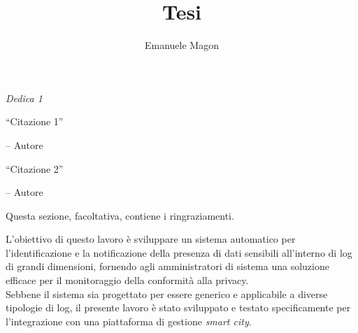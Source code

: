 \documentclass[12pt]{report}
\title{Tesi}
\author{Emanuele Magon}
\begin{document}
\makecenteredfrontpage
{}

%
%

{\raggedleft \large \sl Dedica 1\\

    \vspace{2cm}

    ``Citazione 1''

    \bigskip

    \--- Autore\\

    \vspace{2cm}

    ``Citazione 2''

    \bigskip

    \--- Autore\\}

\clearpage
\beforepreface

%
%


%
%

Questa sezione, facoltativa, contiene i ringraziamenti.

%
%

\afterpreface



%
%


L'obiettivo di questo lavoro è sviluppare un sistema automatico per l'identificazione e la notificazione della presenza di dati sensibili all'interno di log di grandi dimensioni, fornendo agli amministratori di sistema una soluzione efficace per il monitoraggio della conformità alla privacy. \\
Sebbene il sistema sia progettato per essere generico e applicabile a diverse tipologie di log, il presente lavoro è stato sviluppato e testato specificamente per l'integrazione con una piattaforma di gestione \textit{smart city}.
\end{document}
